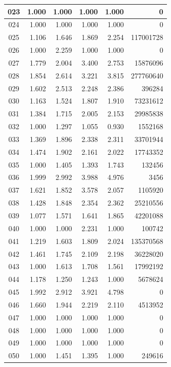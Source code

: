 \begin{longtable}{|c|r|r|r|r|r|}
\hline
023 & 1.000 & 1.000 & 1.000 & 1.000 & 0 \\
\hline
024 & 1.000 & 1.000 & 1.000 & 1.000 & 0 \\
\hline
025 & 1.106 & 1.646 & 1.869 & 2.254 & 117001728 \\
\hline
026 & 1.000 & 2.259 & 1.000 & 1.000 & 0 \\
\hline
027 & 1.779 & 2.004 & 3.400 & 2.753 & 15876096 \\
\hline
028 & 1.854 & 2.614 & 3.221 & 3.815 & 277760640 \\
\hline
029 & 1.602 & 2.513 & 2.248 & 2.386 & 396284 \\
\hline
030 & 1.163 & 1.524 & 1.807 & 1.910 & 73231612 \\
\hline
031 & 1.384 & 1.715 & 2.005 & 2.153 & 29985838 \\
\hline
032 & 1.000 & 1.297 & 1.055 & 0.930 & 1552168 \\
\hline
033 & 1.369 & 1.896 & 2.338 & 2.311 & 33701944 \\
\hline
034 & 1.474 & 1.902 & 2.161 & 2.022 & 17743352 \\
\hline
035 & 1.000 & 1.405 & 1.393 & 1.743 & 132456 \\
\hline
036 & 1.999 & 2.992 & 3.988 & 4.976 & 3456 \\
\hline
037 & 1.621 & 1.852 & 3.578 & 2.057 & 1105920 \\
\hline
038 & 1.428 & 1.848 & 2.354 & 2.362 & 25210556 \\
\hline
039 & 1.077 & 1.571 & 1.641 & 1.865 & 42201088 \\
\hline
040 & 1.000 & 1.000 & 2.231 & 1.000 & 100742 \\
\hline
041 & 1.219 & 1.603 & 1.809 & 2.024 & 135370568 \\
\hline
042 & 1.461 & 1.745 & 2.109 & 2.198 & 36228020 \\
\hline
043 & 1.000 & 1.613 & 1.708 & 1.561 & 17992192 \\
\hline
044 & 1.178 & 1.250 & 1.243 & 1.000 & 5678624 \\
\hline
045 & 1.992 & 2.912 & 3.921 & 4.798 & 0 \\
\hline
046 & 1.660 & 1.944 & 2.219 & 2.110 & 4513952 \\
\hline
047 & 1.000 & 1.000 & 1.000 & 1.000 & 0 \\
\hline
048 & 1.000 & 1.000 & 1.000 & 1.000 & 0 \\
\hline
049 & 1.000 & 1.000 & 1.000 & 1.000 & 0 \\
\hline
050 & 1.000 & 1.451 & 1.395 & 1.000 & 249616 \\

\end{longtable}
